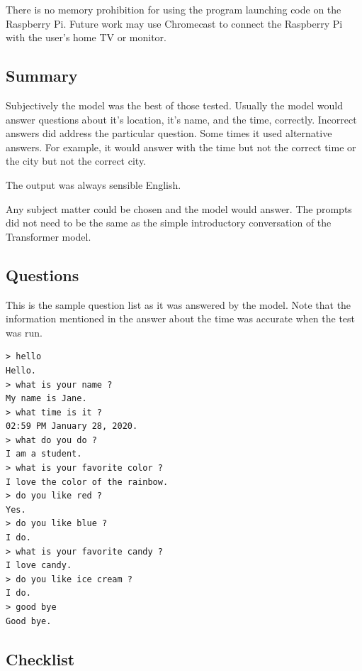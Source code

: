 There is no memory prohibition for using the program launching code on the Raspberry Pi. Future work may use Chromecast to connect the Raspberry Pi with the user's home TV or monitor. 

\subsection{Summary}

Subjectively the model was the best of those tested. Usually the model would answer questions about it's location, it's name, and the time, correctly. %
Incorrect answers did address the particular question.
Some times it used alternative answers. For example, it would answer with the time but not the correct time or the city but not the correct city.  %

The output was always sensible English. %
 
Any subject matter could be chosen and the model would answer. The prompts did not need to be the same as the simple introductory conversation of the Transformer model. 

\subsection{Questions}
This is the sample question list as it was answered by the model. Note that the information mentioned in the answer about the time was accurate when the test was run.

\begin{verbatim}
> hello
Hello.
> what is your name ?
My name is Jane.
> what time is it ?
02:59 PM January 28, 2020.
> what do you do ?
I am a student.
> what is your favorite color ?
I love the color of the rainbow.
> do you like red ?
Yes.
> do you like blue ?
I do.
> what is your favorite candy ?
I love candy.
> do you like ice cream ?
I do. 
> good bye
Good bye.
\end{verbatim}

\subsection{Checklist}

